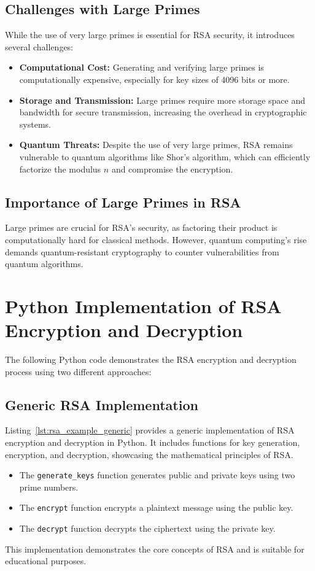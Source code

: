 \documentclass[12pt,a4paper]{report}
\begin{document}
\subsection{Challenges with Large Primes}
While the use of very large primes is essential for RSA security, it introduces several challenges:
\begin{itemize}
    \item \textbf{Computational Cost:} Generating and verifying large primes is computationally expensive, especially for key sizes of 4096 bits or more.
    \item \textbf{Storage and Transmission:} Large primes require more storage space and bandwidth for secure transmission, increasing the overhead in cryptographic systems.
    \item \textbf{Quantum Threats:} Despite the use of very large primes, RSA remains vulnerable to quantum algorithms like Shor's algorithm, which can efficiently factorize the modulus \( n \) and compromise the encryption.
\end{itemize}

\subsection{Importance of Large Primes in RSA}
Large primes are crucial for RSA's security, as factoring their product is computationally hard for classical methods. However, quantum computing's rise demands quantum-resistant cryptography to counter vulnerabilities from quantum algorithms.

\section{Python Implementation of RSA Encryption and Decryption}
The following Python code demonstrates the RSA encryption and decryption process using two different approaches:

\subsection{Generic RSA Implementation}
Listing~\ref{lst:rsa_example_generic} provides a generic implementation of RSA encryption and decryption in Python. It includes functions for key generation, encryption, and decryption, showcasing the mathematical principles of RSA.

\begin{itemize}
    \item The \texttt{generate\_keys} function generates public and private keys using two prime numbers.
    \item The \texttt{encrypt} function encrypts a plaintext message using the public key.
    \item The \texttt{decrypt} function decrypts the ciphertext using the private key.
\end{itemize}
\sloppy
This implementation demonstrates the core concepts of RSA and is suitable for educational purposes.
\end{document}
